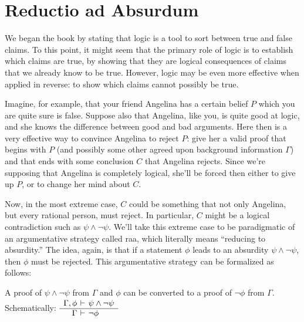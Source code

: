 \section{Reductio ad Absurdum}

We began the book by stating that logic is a tool to sort between true
and false claims.  To this point, it might seem that the primary role
of logic is to establish which claims are true, by showing that they
are logical consequences of claims that we already know to be true.
However, logic may be even more effective when applied in reverse: to
show which claims cannot possibly be true.

Imagine, for example, that your friend Angelina has a certain belief
$P$ which you are quite sure is false.  Suppose also that Angelina,
like you, is quite good at logic, and she knows the difference between
good and bad arguments.  Here then is a very effective way to convince
Angelina to reject $P$: give her a valid proof that begins with $P$
(and possibly some other agreed upon background information $\Gamma$)
and that ends with some conclusion $C$ that Angelina rejects.  Since
we're supposing that Angelina is completely logical, she'll be forced
then either to give up $P$, or to change her mind about $C$.

Now, in the most extreme case, $C$ could be something that not only
Angelina, but every rational person, must reject.  In particular, $C$
might be a logical contradiction such as $\psi\wedge\neg \psi$.  We'll
take this extreme case to be paradigmatic of an argumentative strategy
called \gls{raa}, which literally means ``reducing to absurdity.''
The idea, again, is that if a statement $\phi$ leads to an absurdity
$\psi\wedge\neg \psi$, then $\phi$ must be rejected.  This
argumentative strategy can be formalized as follows:

\bigskip 
\begin{tcolorbox}[enhanced,width=10cm,title=reductio ad absurdum (RAA),attach boxed title to top
  left={yshift=-2mm,xshift=4mm},boxed title style={sharp corners}]
  A proof of \mbox{$\psi\wedge\neg \psi$} from $\Gamma$ and $\phi$ can
  be converted to a proof of $\neg \phi$ from $\Gamma$.
  Schematically:
  $\begin{array}{r@{\:\,}c@{\:\,}l} \Gamma ,\phi &\vdash & \psi\wedge
    \neg \psi \\ \hline \Gamma &\vdash & \neg \phi \end{array} $
 \end{tcolorbox} \bigskip

